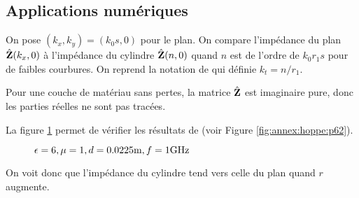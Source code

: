   \subsection{Applications numériques}

    On pose \((k_x,k_y) = (k_0 s, 0)\) pour le plan.
    On compare l'impédance du plan \(\hat{\mathbf{Z}}(k_x,0)\) à l'impédance du cylindre \(\hat{\mathbf{Z}}(n,0)\) quand \(n\) est de l'ordre de \(k_0r_1s\) pour de faibles courbures.
    On reprend la notation de \cite[p.~62]{hoppe_impedance_1995} qui définie \(k_t= n/r_1\).

    Pour une couche de matériau sans pertes, la matrice \(\hat{\mathbf{Z}}\) est imaginaire pure, donc les parties réelles ne sont pas tracées.

    La figure \ref{fig:imp_fourier:cylindre:hoppe_p62:converge_rayon} permet de vérifier les résultats de \cite[p.~62]{hoppe_impedance_1995} (voir Figure \ref{fig:annex:hoppe:p62}).

    \begin{figure}[!hbt]
      \centering
      
      \caption{\(\epsilon = 6, \mu = 1, d=0.0225\text{m}, f=1\text{GHz}\)}
      \label{fig:imp_fourier:cylindre:hoppe_p62:converge_rayon}
    \end{figure}
    On voit donc que l'impédance du cylindre tend vers celle du plan quand \(r\) augmente.




